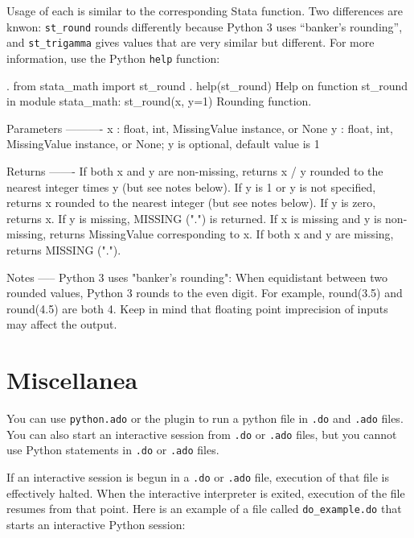 \documentclass{article}
\begin{document}
Usage of each is similar to the corresponding Stata function. Two differences are knwon: \lstinline{st_round} rounds differently because Python 3 uses ``banker's rounding'', and \lstinline{st_trigamma} gives values that are very similar but different. For more information, use the Python \lstinline{help} function:

\begin{stlog}
{\smallskip}
{\bftt{>>>}}. from stata_math import st_round
{\smallskip}
{\bftt{>>>}}. help(st_round)
Help on function st_round in module stata_math:
{\smallskip}
st_round(x, y=1)
    Rounding function.
    
    Parameters
    ----------
    x : float, int, MissingValue instance, or None
    y : float, int, MissingValue instance, or None;
        y is optional, default value is 1
    
    Returns
    -------
    If both x and y are non-missing, returns x / y rounded to
        the nearest integer times y (but see notes below).
    If y is 1 or y is not specified, returns x rounded to the 
        nearest integer (but see notes below).
    If y is zero, returns x.
    If y is missing, MISSING (".") is returned.
    If x is missing and y is non-missing, returns MissingValue
        corresponding to x.
    If both x and y are missing, returns MISSING (".").
    
    Notes
    -----
    Python 3 uses "banker's rounding": When equidistant between two rounded
    values, Python 3 rounds to the even digit. For example, round(3.5) and
    round(4.5) are both 4. Keep in mind that floating point imprecision of
    inputs may affect the output.
{\smallskip}
{\smallskip}
\end{stlog}



\section{Miscellanea} \label{misc}
		
You can use \lstinline$python.ado$ or the plugin to run a python file in \lstinline$.do$ and \lstinline$.ado$ files. You can also start an interactive session from \lstinline$.do$ or \lstinline{.ado} files, but you cannot use Python statements in \lstinline$.do$ or \lstinline$.ado$ files.
		
If an interactive session is begun in a \lstinline{.do} or \lstinline{.ado} file, execution of that file is effectively halted. When the interactive interpreter is exited, execution of the file resumes from that point. Here is an example of a file called \lstinline$do_example.do$ that starts an interactive Python session: \newline
\end{document}
